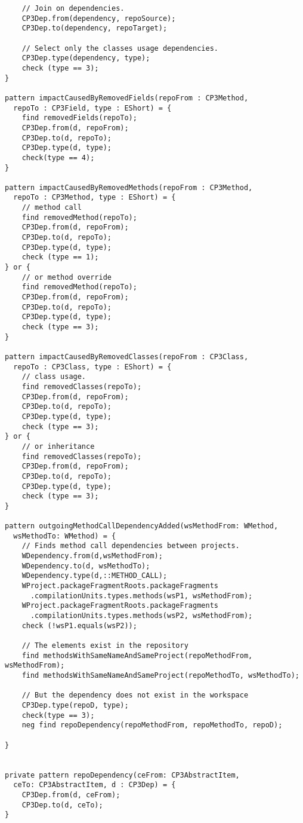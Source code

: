 \begin{lstlisting}
	// Join on dependencies.
	CP3Dep.from(dependency, repoSource);
	CP3Dep.to(dependency, repoTarget);

	// Select only the classes usage dependencies.
	CP3Dep.type(dependency, type);
	check (type == 3);
}

pattern impactCausedByRemovedFields(repoFrom : CP3Method, 
  repoTo : CP3Field, type : EShort) = {
	find removedFields(repoTo);
	CP3Dep.from(d, repoFrom);
	CP3Dep.to(d, repoTo);
	CP3Dep.type(d, type);
	check(type == 4);
}

pattern impactCausedByRemovedMethods(repoFrom : CP3Method, 
  repoTo : CP3Method, type : EShort) = {
	// method call
	find removedMethod(repoTo);
	CP3Dep.from(d, repoFrom);
	CP3Dep.to(d, repoTo);
	CP3Dep.type(d, type);
	check (type == 1);
} or {
	// or method override
	find removedMethod(repoTo);
	CP3Dep.from(d, repoFrom);
	CP3Dep.to(d, repoTo);
	CP3Dep.type(d, type);
	check (type == 3);
}

pattern impactCausedByRemovedClasses(repoFrom : CP3Class, 
  repoTo : CP3Class, type : EShort) = {
	// class usage.
	find removedClasses(repoTo);
	CP3Dep.from(d, repoFrom);
	CP3Dep.to(d, repoTo);
	CP3Dep.type(d, type);
	check (type == 3);
} or {
	// or inheritance
	find removedClasses(repoTo);
	CP3Dep.from(d, repoFrom);
	CP3Dep.to(d, repoTo);
	CP3Dep.type(d, type);
	check (type == 3);
}

pattern outgoingMethodCallDependencyAdded(wsMethodFrom: WMethod, 
  wsMethodTo: WMethod) = {	
	// Finds method call dependencies between projects.
	WDependency.from(d,wsMethodFrom);
	WDependency.to(d, wsMethodTo);
	WDependency.type(d,::METHOD_CALL);
	WProject.packageFragmentRoots.packageFragments
	  .compilationUnits.types.methods(wsP1, wsMethodFrom);
	WProject.packageFragmentRoots.packageFragments
	  .compilationUnits.types.methods(wsP2, wsMethodFrom);
	check (!wsP1.equals(wsP2));
	
	// The elements exist in the repository
	find methodsWithSameNameAndSameProject(repoMethodFrom, wsMethodFrom);
	find methodsWithSameNameAndSameProject(repoMethodTo, wsMethodTo);
	
	// But the dependency does not exist in the workspace
	CP3Dep.type(repoD, type);
	check(type == 3);
	neg find repoDependency(repoMethodFrom, repoMethodTo, repoD);
	
}


private pattern repoDependency(ceFrom: CP3AbstractItem, 
  ceTo: CP3AbstractItem, d : CP3Dep) = {
	CP3Dep.from(d, ceFrom);
	CP3Dep.to(d, ceTo);
}

\end{lstlisting}
